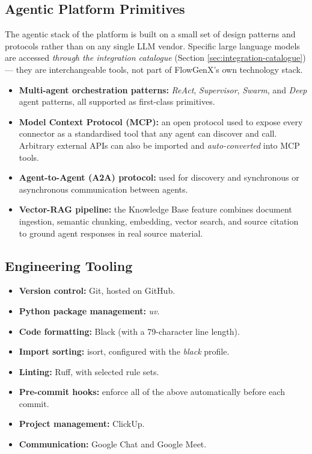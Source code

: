 \subsection{Agentic Platform Primitives}
The agentic stack of the platform is built on a small set of design
patterns and protocols rather than on any single LLM vendor.
Specific large language models are accessed \emph{through the
integration catalogue} (Section \ref{sec:integration-catalogue}) ---
they are interchangeable tools, not part of FlowGenX's own
technology stack.

\begin{itemize}[leftmargin=*]
    \item \textbf{Multi-agent orchestration patterns:} \emph{ReAct},
    \emph{Supervisor}, \emph{Swarm}, and \emph{Deep} agent patterns,
    all supported as first-class primitives.
    \item \textbf{Model Context Protocol (MCP):} an open protocol used
    to expose every connector as a standardised tool that any agent
    can discover and call. Arbitrary external APIs can also be
    imported and \emph{auto-converted} into MCP tools.
    \item \textbf{Agent-to-Agent (A2A) protocol:} used for discovery
    and synchronous or asynchronous communication between agents.
    \item \textbf{Vector-RAG pipeline:} the Knowledge Base feature
    combines document ingestion, semantic chunking, embedding,
    vector search, and source citation to ground agent responses in
    real source material.
\end{itemize}

\subsection{Engineering Tooling}
\begin{itemize}[leftmargin=*]
    \item \textbf{Version control:} Git, hosted on GitHub.
    \item \textbf{Python package management:} \emph{uv}.
    \item \textbf{Code formatting:} Black (with a 79-character line
    length).
    \item \textbf{Import sorting:} isort, configured with the
    \emph{black} profile.
    \item \textbf{Linting:} Ruff, with selected rule sets.
    \item \textbf{Pre-commit hooks:} enforce all of the above
    automatically before each commit.
    \item \textbf{Project management:} ClickUp.
    \item \textbf{Communication:} Google Chat and Google Meet.
\end{itemize}

